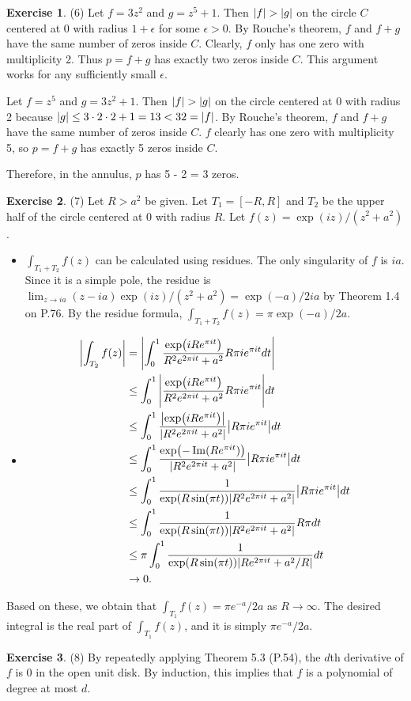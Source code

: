 \documentclass[12pt, psamsfonts]{amsart}
\theoremstyle{definition}
\newtheorem*{exer}{Exercise}
\theoremstyle{remark}
\numberwithin{equation}{section}
\begin{document}
\begin{exer}{(6)}
  Let $f = 3z^2$ and $g = z^5 + 1$.
  Then $\abs{f} > \abs{g}$ on the circle $C$ centered at 0 with radius $1 + \epsilon$ for some $\epsilon > 0$.
  By Rouche's theorem, $f$ and $f + g$ have the same number of zeros inside $C$.
  Clearly, $f$ only has one zero with multiplicity 2.
  Thus $p = f + g$ has exactly two zeros inside $C$.
  This argument works for any sufficiently small $\epsilon$.

  Let $f = z^5$ and $g = 3z^2 + 1$.
  Then $\abs{f} > \abs{g}$ on the circle centered at 0 with radius 2 because $\abs{g} \leq 3 \cdot 2 \cdot 2 + 1 = 13 < 32 = \abs{f}$.
  By Rouche's theorem, $f$ and $f + g$ have the same number of zeros inside $C$.
  $f$ clearly has one zero with multiplicity 5, so $p = f + g$ has exactly 5 zeros inside $C$.

  Therefore, in the annulus, $p$ has 5 - 2 = 3 zeros.
\end{exer}

\begin{exer}{(7)}
  Let $R > a^2$ be given.
  Let $T_1 = [-R, R]$ and $T_2$ be the upper half of the circle centered at 0 with radius $R$.
  Let $f(z) = \exp(iz) / (z^2 + a^2)$.

  \begin{itemize}
    \item
      $\int_{T_1 + T_2} f(z)$ can be calculated using residues.
      The only singularity of $f$ is $ia$.
      Since it is a simple pole, the residue is $\lim_{z \rightarrow ia} (z - ia)\exp(iz) / (z^2 + a^2) = \exp(-a) / 2ia$ by Theorem 1.4 on P.76.
      By the residue formula, $\int_{T_1 + T_2} f(z) = \pi\exp(-a) / 2a$.
    \item
      \begin{align*}
        \abs{\int_{T_2} f(z)}
          &= \abs{\int_{0}^{1} \frac{\exp(iRe^{\pi i t})}{R^2e^{2\pi it} + a^2} R\pi i e^{\pi i t} dt} \\
          &\leq \int_{0}^{1} \abs{\frac{\exp(iRe^{\pi i t})}{R^2e^{2\pi it} + a^2} R\pi i e^{\pi i t}} dt \\
          &\leq \int_{0}^{1} \frac{\abs{\exp(iRe^{\pi i t})}}{\abs{R^2e^{2\pi it} + a^2}} \abs{R\pi i e^{\pi i t}} dt \\
          &\leq \int_{0}^{1} \frac{\exp(-\Im(R e^{\pi i t}))}{\abs{R^2e^{2\pi it} + a^2}} \abs{R\pi i e^{\pi i t}} dt \\
          &\leq \int_{0}^{1} \frac{1}{\exp(R\sin(\pi t))\abs{R^2e^{2\pi it} + a^2}} \abs{R\pi i e^{\pi i t}} dt \\
          &\leq \int_{0}^{1} \frac{1}{\exp(R\sin(\pi t))\abs{R^2e^{2\pi it} + a^2}} R\pi dt \\
          &\leq \pi \int_{0}^{1} \frac{1}{\exp(R\sin(\pi t))\abs{Re^{2\pi it} + a^2 / R}} dt \\
          &\rightarrow 0. %
      \end{align*}
  \end{itemize}
  Based on these, we obtain that $\int_{T_1} f(z) = \pi e^{-a} / 2a$ as $R \rightarrow \infty$.
  The desired integral is the real part of $\int_{T_1} f(z)$, and it is simply $\pi e^{-a} / 2a$.
\end{exer}

\begin{exer}{(8)}
  By repeatedly applying Theorem 5.3 (P.54), the $d$th derivative of $f$ is 0 in the open unit disk.
  By induction, this implies that $f$ is a polynomial of degree at most $d$.
\end{exer}
\end{document}
